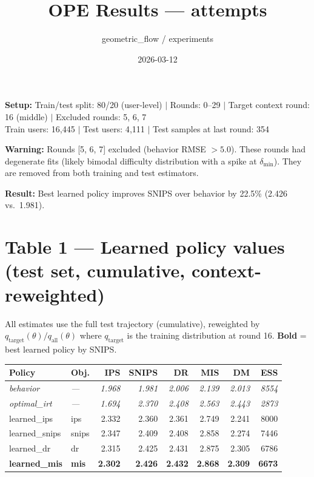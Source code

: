 \documentclass[11pt]{article}
\title{\textbf{OPE Results --- attempts}}
\date{2026-03-12}
\author{geometric\_flow / experiments}
\begin{document}
\maketitle

\noindent\textbf{Setup:}
Train/test split: 80/20 (user-level) $|$
Rounds: 0--29 $|$
Target context round: 16 (middle) $|$
Excluded rounds: 5, 6, 7\\
Train users: 16{,}445 $|$ Test users: 4{,}111 $|$ Test samples at last round: 354

\bigskip
\noindent\colorbox{warnbg}{\parbox{0.97\textwidth}{%
\textbf{Warning:} Rounds [5, 6, 7] excluded (behavior RMSE $> 5.0$). These rounds had degenerate fits
(likely bimodal difficulty distribution with a spike at $\delta_{\min}$).
They are removed from both training and test estimators.}}

\medskip
\noindent\colorbox{goodbg}{\parbox{0.97\textwidth}{%
\textbf{Result:} Best learned policy improves SNIPS over behavior by 22.5\% (2.426 vs.\ 1.981).}}

\section*{Table 1 — Learned policy values (test set, cumulative, context-reweighted)}

{\small All estimates use the full test trajectory (cumulative), reweighted by
$q_{\text{target}}(\theta) / q_{\text{all}}(\theta)$ where $q_{\text{target}}$ is the
training distribution at round 16. \textbf{Bold} = best learned policy by SNIPS.}

\bigskip
\begin{tabular}{llrrrrrr}
\toprule
\textbf{Policy} & \textbf{Obj.} & \textbf{IPS} & \textbf{SNIPS} & \textbf{DR} & \textbf{MIS} & \textbf{DM} & \textbf{ESS} \\
\midrule
\rowcolor{behbg}
\textit{behavior} & \textit{---} & \textit{1.968} & \textit{1.981} & \textit{2.006} & \textit{2.139} & \textit{2.013} & \textit{8554} \\
\rowcolor{oraclebg}
\textit{optimal\_irt} & \textit{---} & \textit{1.694} & \textit{2.370} & \textit{2.408} & \textit{2.563} & \textit{2.443} & \textit{2873} \\
learned\_ips & ips & 2.332 & 2.360 & 2.361 & 2.749 & 2.241 & 8000 \\
learned\_snips & snips & 2.347 & 2.409 & 2.408 & 2.858 & 2.274 & 7446 \\
learned\_dr & dr & 2.315 & 2.425 & 2.431 & 2.875 & 2.305 & 6786 \\
\textbf{learned\_mis} & \textbf{mis} & \textbf{2.302} & \textbf{2.426} & \textbf{2.432} & \textbf{2.868} & \textbf{2.309} & \textbf{6673} \\
\bottomrule
\end{tabular}
\end{document}
